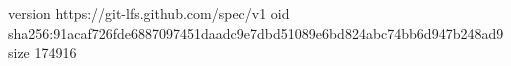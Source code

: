 version https://git-lfs.github.com/spec/v1
oid sha256:91acaf726fde6887097451daadc9e7dbd51089e6bd824abc74bb6d947b248ad9
size 174916
